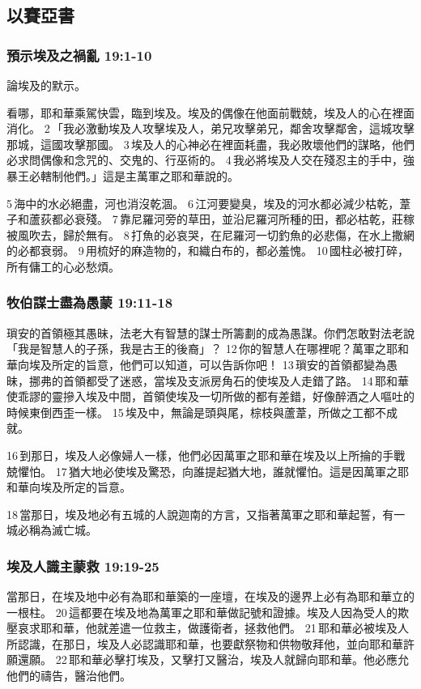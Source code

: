 \subsection{以賽亞書}
\subsubsection{預示埃及之禍亂 19:1-10}
論埃及的默示。

看哪，耶和華乘駕快雲，臨到埃及。埃及的偶像在他面前戰兢，埃及人的心在裡面消化。 2 「我必激動埃及人攻擊埃及人，弟兄攻擊弟兄，鄰舍攻擊鄰舍，這城攻擊那城，這國攻擊那國。 3 埃及人的心神必在裡面耗盡，我必敗壞他們的謀略，他們必求問偶像和念咒的、交鬼的、行巫術的。 4 我必將埃及人交在殘忍主的手中，強暴王必轄制他們。」這是主萬軍之耶和華說的。

5 海中的水必絕盡，河也消沒乾涸。 6 江河要變臭，埃及的河水都必減少枯乾，葦子和蘆荻都必衰殘。 7 靠尼羅河旁的草田，並沿尼羅河所種的田，都必枯乾，莊稼被風吹去，歸於無有。 8 打魚的必哀哭，在尼羅河一切釣魚的必悲傷，在水上撒網的必都衰弱。 9 用梳好的麻造物的，和織白布的，都必羞愧。 10 國柱必被打碎，所有傭工的心必愁煩。

\subsubsection{牧伯謀士盡為愚蒙 19:11-18}
瑣安的首領極其愚昧，法老大有智慧的謀士所籌劃的成為愚謀。你們怎敢對法老說「我是智慧人的子孫，我是古王的後裔」？ 12 你的智慧人在哪裡呢？萬軍之耶和華向埃及所定的旨意，他們可以知道，可以告訴你吧！ 13 瑣安的首領都變為愚昧，挪弗的首領都受了迷惑，當埃及支派房角石的使埃及人走錯了路。 14 耶和華使乖謬的靈摻入埃及中間，首領使埃及一切所做的都有差錯，好像醉酒之人嘔吐的時候東倒西歪一樣。 15 埃及中，無論是頭與尾，棕枝與蘆葦，所做之工都不成就。

16 到那日，埃及人必像婦人一樣，他們必因萬軍之耶和華在埃及以上所掄的手戰兢懼怕。 17 猶大地必使埃及驚恐，向誰提起猶大地，誰就懼怕。這是因萬軍之耶和華向埃及所定的旨意。

18 當那日，埃及地必有五城的人說迦南的方言，又指著萬軍之耶和華起誓，有一城必稱為滅亡城。

\subsubsection{埃及人識主蒙救 19:19-25}
當那日，在埃及地中必有為耶和華築的一座壇，在埃及的邊界上必有為耶和華立的一根柱。 20 這都要在埃及地為萬軍之耶和華做記號和證據。埃及人因為受人的欺壓哀求耶和華，他就差遣一位救主，做護衛者，拯救他們。 21 耶和華必被埃及人所認識，在那日，埃及人必認識耶和華，也要獻祭物和供物敬拜他，並向耶和華許願還願。 22 耶和華必擊打埃及，又擊打又醫治，埃及人就歸向耶和華。他必應允他們的禱告，醫治他們。

